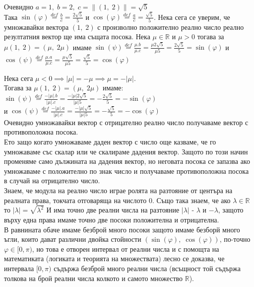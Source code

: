 \documentclass[12pt]{article}
\newcommand{\R}{\mathbb{R}}
\begin{document}
Очевидно $a = 1, \; b = 2, \; c = \|(1, \; 2)\| = \sqrt{5}$ \\

Така $ \sin(\varphi) \overset{def}{=} \frac{b}{c} = \frac{2\sqrt{5}}{5} $ и $ \cos(\varphi) \overset{def}{=} \frac{a}{c} = \frac{\sqrt{5}}{5} $. Нека сега се уверим,
че умножавайки вектора $(1, \; 2)$ с произволно положително реално число реално резултатния вектор ще има същата посока.
Нека $\mu \in \R$ и $\mu > 0$ тогава за $\mu(1, \; 2) = (\mu, \; 2\mu) $ имаме
$ \sin(\psi) \overset{def}{=} \frac{\mu.b}{\mu.c} = \frac{\mu2\sqrt{5}}{\mu5} = \frac{2\sqrt{5}}{5} = \sin(\varphi) $
и $ \cos(\psi) \overset{def}{=} \frac{\mu.a}{\mu.c} = \frac{\mu\sqrt{5}}{\mu5} = \frac{\sqrt{5}}{5} = \cos(\varphi) $

Нека сега $\mu < 0 \implies |\mu| = -\mu \implies \mu = -|\mu| $. \\
Тогава за $\mu(1, \; 2) = (\mu, \; 2\mu) $ имаме: \\
$ \sin(\psi) \overset{def}{=} \frac{-|\mu|.b}{|\mu|.c} = \frac{-|\mu|2\sqrt{5}}{|\mu|5} = -\frac{2\sqrt{5}}{5} = -\sin(\varphi) $ \\
и $ \cos(\psi) \overset{def}{=} \frac{-|\mu|.a}{|\mu|.c} = \frac{-|\mu|\sqrt{5}}{|\mu|5} = -\frac{\sqrt{5}}{5} = -\cos(\varphi) $ \\

Очевидно умножавайки вектор с отрицателно реално число получаваме вектор с противоположна посока. \\

Ето защо когато умножаваме даден вектор с число още казваме, че го умножаваме със скалар или че скалираме дадения вектор.
Защото по този начин променяме само дължината на дадения вектор, но неговата посока се запазва ако умножаваме с положително по знак число и
получаваме противоположна посока в случай на отрицателно число. \\

Знаем, че модула на реално число играе ролята на разтояние от центъра на реалната права, токчата отговаряща на числото $0$.
Също така знаем, че ако $\lambda \in \R$ то $|\lambda| = \sqrt{\lambda^2}$ И има точно две реални числа на разтояние
$|\lambda|$ - $\lambda$ и $-\lambda$, защото върху една права имаме точно две посоки положителна и отрицателна. \\

В равнината обаче имаме безброй много посоки защото имаме безборй много ъгли, които дават различни двойка стойности $(\sin(\varphi), \; \cos(\varphi))$,
по-точно $\varphi \in [0, \pi)$, но това е отворен интервал от реални числа и с помощта на математиката (логиката и теорията на множествата) лесно
се доказва, че интервала $[0, \pi)$ съдържа безброй много реални числа (всъщност той съдържа толкова на брой реални числа колкото и самото множество $\R$). \\
\end{document}
